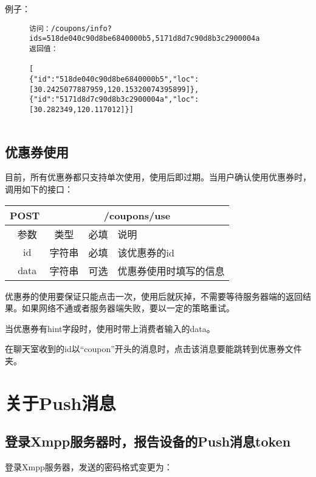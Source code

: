 例子：

\begin{figure}[H]
\begin{verbatim}
访问：/coupons/info?ids=518de040c90d8be6840000b5,5171d8d7c90d8b3c2900004a
返回值：

[
{"id":"518de040c90d8be6840000b5","loc":[30.2425077887959,120.15320074395899]},
{"id":"5171d8d7c90d8b3c2900004a","loc":[30.282349,120.117012]}]


\end{verbatim}
\end{figure}







\subsection{优惠券使用}
目前，所有优惠券都只支持单次使用，使用后即过期。当用户确认使用优惠券时，调用如下的接口：
\begin{table}[H]
   \begin{center}
\begin{tabular}{|c|c|c|p{12cm}|}
\hline
POST & \multicolumn{3}{|c|}{/coupons/use} \\
\hline\hline
 \  参数  & 类型 & 必填 &  说明  \\
\hline
 \  id  & 字符串 & 必填 &  该优惠券的id  \\
 \hline
 \  data  & 字符串 & 可选 &  优惠券使用时填写的信息  \\
\hline
\end{tabular}
   \end{center}
\end{table}

优惠券的使用要保证只能点击一次，使用后就灰掉，不需要等待服务器端的返回结果。如果网络不通或者服务器端失败，要以一定的策略重试。

当优惠券有hint字段时，使用时带上消费者输入的data。


在聊天室收到的id以“coupon”开头的消息时，点击该消息要能跳转到优惠券文件夹。




\section{关于Push消息}

\subsection{登录Xmpp服务器时，报告设备的Push消息token}
登录Xmpp服务器，发送的密码格式变更为：

